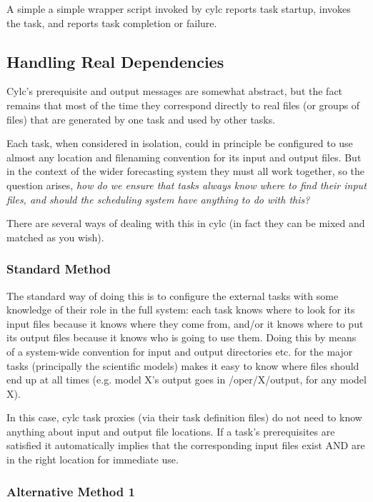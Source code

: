 \documentclass[11pt,a4paper]{article}
\begin{document}
A simple a simple wrapper script invoked by cylc reports task
startup, invokes the task, and reports task completion or failure. 

\pagebreak

\subsection{Handling Real Dependencies}
\label{HandlingRealDependencies}

Cylc's prerequisite and output messages are somewhat abstract, but the
fact remains that most of the time they correspond directly to real 
files (or groups of files) that are generated by one task and used by
other tasks.

Each task, when considered in isolation, could in principle be
configured to use almost any location and filenaming convention for its
input and output files. But in the context of the wider forecasting
system they must all work together, so the question arises, {\em how do
we ensure that tasks always know where to find their input files, and
should the scheduling system have anything to do with this?} 

There are several ways of dealing with this in cylc (in fact they can
be mixed and matched as you wish). 

\subsubsection{Standard Method}

The standard way of doing this is to configure the external tasks with
some knowledge of their role in the full system: each task knows where
to look for its input files because it knows where they come from,
and/or it knows where to put its output files because it knows who is
going to use them. Doing this by means of a system-wide convention for 
input and output directories  etc. for the major tasks (principally the
scientific models) makes it easy to know where files should end up at
all times (e.g. model X's output goes in /oper/X/output, for any model
X).

In this case, cylc task proxies (via their task definition files) do not
need to know anything about input and output file locations. If a task's
prerequisites are satisfied it automatically implies that the
corresponding input files exist AND are in the right location for
immediate use.

\subsubsection{Alternative Method 1}
\end{document}
